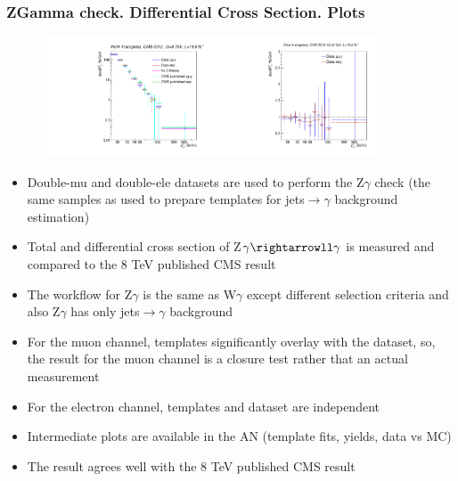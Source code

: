 \begin{frame}\frametitle{ZGamma check. Differential Cross Section. Plots}
\begin{figure}[htb]
  \begin{center}
 \includegraphics[width=0.45\textwidth]{../figs/figs_v11/ChannelsMERGED_ZGamma/CrossSection/compareCSZGamma.pdf}\includegraphics[width=0.45\textwidth]{../figs/figs_v11/ChannelsMERGED_ZGamma/CrossSection/compareCSratioOttoZGamma.pdf}
  \end{center}
\end{figure}
  \tiny
  \begin{itemize}
     \item Double-mu and double-ele datasets are used to perform the Z$\gamma$ check (the same samples as used to prepare templates for jets$\rightarrow\gamma$ background estimation)
     \item Total and differential cross section of Z$\gamma\rightarrowll\gamma$ is measured and compared to the 8 TeV published CMS result
     \item The workflow for Z$\gamma$ is the same as W$\gamma$ except different selection criteria and also Z$\gamma$ has only jets$\rightarrow\gamma$ background
     \item For the muon channel, templates significantly overlay with the dataset, so, the result for the muon channel is a closure test rather that an actual measurement
     \item For the electron channel, templates and dataset are independent
     \item Intermediate plots are available in the AN (template fits, yields, data vs MC)
     \item The result agrees well with the 8 TeV published CMS result
  \end{itemize}
\end{frame}%
